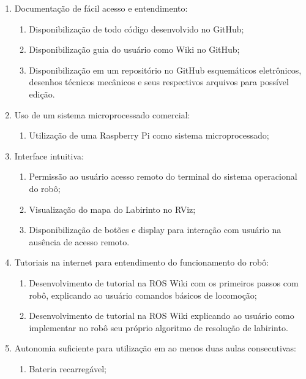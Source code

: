 \begin{enumerate}
	\item Documentação de fácil acesso e entendimento:
	\begin{enumerate}
		\item Disponibilização de todo código desenvolvido no GitHub;
		
		\item Disponibilização guia do usuário como Wiki no GitHub;
		
		\item Disponibilização em um repositório no GitHub esquemáticos eletrônicos, desenhos técnicos mecânicos e seus respectivos arquivos para possível edição.
	\end{enumerate}
	
	\item Uso de um sistema microprocessado comercial:
	\begin{enumerate}
		\item Utilização de uma Raspberry Pi como sistema microprocessado;
	\end{enumerate}
	
	\item Interface intuitiva:
	\begin{enumerate}
		\item Permissão ao usuário acesso remoto do terminal do sistema operacional do robô;
		
		\item Visualização do mapa do Labirinto no RViz;
		
		\item Disponibilização de botões e display para interação com usuário na ausência de acesso remoto.
		
	\end{enumerate}
	
	\item Tutoriais na internet para entendimento do funcionamento do robô:
	\begin{enumerate}
		\item Desenvolvimento de tutorial na ROS Wiki com os primeiros passos com robô, explicando ao usuário comandos básicos de locomoção;
		
		\item Desenvolvimento de tutorial na ROS Wiki explicando ao usuário como implementar no robô seu próprio algoritmo de resolução de labirinto.
	\end{enumerate}
	
	\item Autonomia suficiente para utilização em ao menos duas aulas consecutivas:
	\begin{enumerate}
		\item Bateria recarregável;
		

\end{enumerate}
\end{enumerate}
